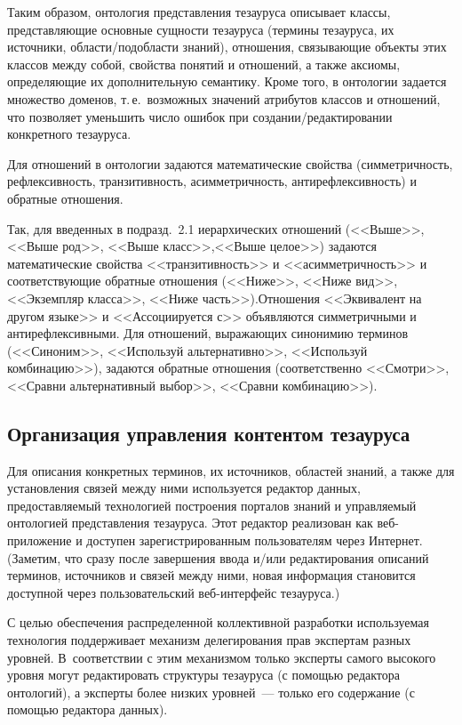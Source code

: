 \begin{multicols}{2}
  Таким образом, онтология представления тезауруса описывает классы, представляющие 
основные сущности тезауруса (термины тезауруса, их источники, области/подобласти 
знаний), отношения, связывающие объекты этих классов между собой, свойства понятий и 
отношений, а также аксиомы, определяющие их дополнительную семантику. Кроме того, в 
онтологии задается множество доменов, т.\,е.\ возможных значений атрибутов классов и 
отношений, что позволяет уменьшить число ошибок при создании/редактировании 
конкретного тезауруса.
  
  Для отношений в онтологии задаются математические свойства (симметричность, 
рефлексивность, транзитивность, асимметричность, антирефлексивность) и обратные 
отношения.
  
  Так, для введенных в подразд.~2.1 иерархических отношений (<<Выше>>, <<Выше род>>, 
<<Выше класс>>,\linebreak <<Выше целое>>) задаются математические  свойства <<транзитивность>> 
и <<асимметричность>> и соответствующие обратные отношения (<<Ниже>>, <<Ниже 
вид>>, <<Экземпляр класса>>, <<Ниже часть>>).\linebreak Отношения <<Эквивалент на другом 
языке>> и <<Ассоциируется с>> объявляются симметричными и антирефлексивными. Для 
отношений, выражающих синонимию терминов (<<Синоним>>, <<Используй\linebreak 
альтернативно>>, <<Используй комбинацию>>), задаются обратные отношения 
(соответственно <<Смот\-ри>>, <<Сравни альтернативный выбор>>, <<Сравни 
комбинацию>>).

\subsection{Организация управления контентом тезауруса}

  Для описания конкретных терминов, их источников, областей знаний, а также для 
установления связей между ними используется редактор данных, предоставляемый 
технологией построения порталов знаний и управляемый онтологией пред\-став\-ле\-ния 
тезауруса. Этот редактор реализован как веб-при\-ло\-же\-ние и доступен зарегистрированным 
пользователям через Интернет. (Заметим, что сразу после завершения ввода и/или 
редактирования описаний терминов, источников и связей между ними, новая информация 
становится доступной через пользовательский веб-интерфейс тезауруса.)
  
  С целью обеспечения распределенной коллективной разработки используемая технология 
поддерживает механизм делегирования прав экспертам разных уровней. В~соответствии с 
этим механизмом только эксперты самого высокого уровня могут редактировать структуры 
тезауруса (с помощью редактора онтологий), а эксперты более низких уровней~--- только его 
содержание (с помощью редактора данных).
  

\end{multicols}
